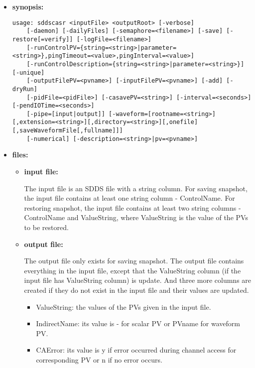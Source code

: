 \begin{itemize}
\item {\bf synopsis:} 
%
%
\begin{verbatim}
usage: sddscasr <inputFile> <outputRoot> [-verbose]
    [-daemon] [-dailyFiles] [-semaphore=<filename>] [-save] [-restore[=verify]] [-logFile=<filename>]
    [-runControlPV={string=<string>|parameter=<string>},pingTimeout=<value>,pingInterval=<value>]
    [-runControlDescription={string=<string>|parameter=<string>}] [-unique]
    [-outputFilePV=<pvname>] [-inputFilePV=<pvname>] [-add] [-dryRun]
    [-pidFile=<pidFile>] [-casavePV=<string>] [-interval=<seconds>] [-pendIOTime=<seconds>]
    [-pipe=[input|output]] [-waveform=[rootname=<string>][,extension=<string>][,directory=<string>][,onefile][,saveWaveformFile[,fullname]]]
    [-numerical] [-description=<string>|pv=<pvname>]
\end{verbatim}
\item {\bf files:}
\begin{itemize}
\item {\bf input file:} \par
The input file is an SDDS file with a string column. For saving snapshot, the input file
contains at least one string column - ControlName. For restoring snapshot, the input file
contains at least two string columns - ControlName and ValueString, where ValueString is the
value of the PVs to be restored.
\item {\bf output file:} \par
The output file only exists for saving snapshot. The output file contains everything in the input
file, except that the ValueString column (if the input file has ValueString column) is update. And
three more columns are created if they do not exist in the input file and their values are updated.
\begin{itemize}
\item {ValueString}: the values of the PVs given in the input file.
\item {IndirectName}: its value  is - for scalar PV or PVname for waveform PV.
\item {CAError}: its value is y if error occurred during channel access for
corresponding PV or n if no error occurs.
\end{itemize}
\end{itemize}


\end{itemize}
